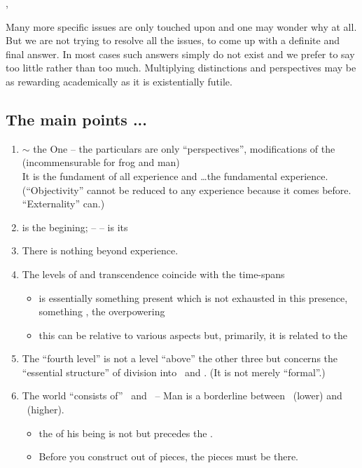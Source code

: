 {\sep

Many more specific issues are only touched upon and one may wonder why at
all. But we are not trying to resolve all the issues, to come up with a definite
and final answer. In most cases such answers simply do not exist and we prefer
to say too little rather than too much. Multiplying distinctions and
perspectives may be as rewarding academically as it is existentially futile. 


\subsection*{The main points ...}
{\small{ \begin{enumerate}
\item {} $\sim$ the One -- the particulars are only 
``perspectives'', modifications of the  (incommensurable for 
frog and man) \\
 It is the fundament of all experience and \ldots the fundamental 
 experience. (``Objectivity'' cannot be reduced to any experience because 
 it comes before. ``Externality'' can.)
\item {} is the begining;  --   -- is its 
\item There is nothing beyond experience.
\item The levels of  and transcendence coincide with the time-spans
 \begin{itemize}
 \item {} is essentially something present which is
 not exhausted in this presence, something , the overpowering
 \item
 this  can be relative to various aspects but, primarily, it is related to the
 \end{itemize}
\item The ``fourth level'' is not a level ``above'' the other three but
 concerns the ``essential structure'' of division into \LL\ and \HH. (It is not
merely ``formal''.)
\item The world ``consists of'' \LL\ and \HH\ --
 Man is a borderline between \LL\ (lower) and \HH\ (higher).
 \begin{itemize}\MyLPar
 \item the  of his being is not  but 
 precedes the .
 \item Before you construct out of pieces, the pieces must be there. \\

\end{itemize}
\end{enumerate}}}}
